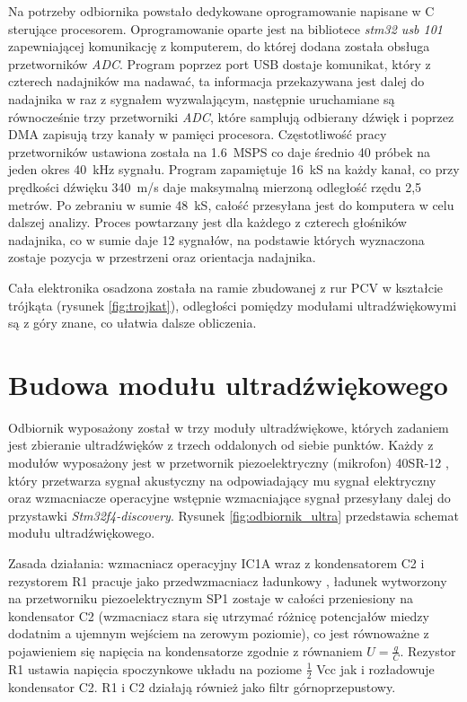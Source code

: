 Na potrzeby odbiornika powstało dedykowane oprogramowanie napisane w C sterujące procesorem.
Oprogramowanie oparte jest na bibliotece \textit{stm32 usb 101} \cite{bib:stm32_usb_101}
zapewniającej komunikację z komputerem, do której dodana została obsługa przetworników \textit{ADC}.
Program poprzez port USB dostaje komunikat, który z czterech nadajników ma nadawać, ta informacja przekazywana jest
dalej do nadajnika w raz z sygnałem wyzwalającym, następnie uruchamiane są równocześnie trzy przetworniki \textit{ADC}, które 
samplują odbierany dźwięk i poprzez DMA zapisują trzy kanały w pamięci procesora.
Częstotliwość pracy przetworników ustawiona została na \SI{1,6}{MSPS} co daje średnio 40 próbek na jeden okres \SI{40}{kHz} sygnału.
Program zapamiętuje \SI{16}{kS} na każdy kanał, co przy prędkości dźwięku \SI{340}{m/s} daje maksymalną mierzoną odległość rzędu 2,5 metrów.
Po zebraniu w sumie \SI{48}{kS}, całość przesyłana jest do komputera w celu dalszej analizy.
Proces powtarzany jest dla każdego z czterech głośników nadajnika, 
co w sumie daje 12 sygnałów, na podstawie których wyznaczona zostaje 
pozycja w przestrzeni oraz orientacja nadajnika.

Cała elektronika osadzona została na ramie zbudowanej z rur PCV w kształcie trójkąta (rysunek \ref{fig:trojkat}), 
odległości pomiędzy modułami ultradźwiękowymi są z góry znane, co ułatwia dalsze obliczenia.




\clearpage
\section{Budowa modułu ultradźwiękowego}

Odbiornik wyposażony został w trzy moduły ultradźwiękowe, których zadaniem jest 
zbieranie ultradźwięków z trzech oddalonych od siebie punktów.
Każdy z modułów wyposażony jest w przetwornik piezoelektryczny (mikrofon) 40SR-12 \cite{bib:40ST12},
który przetwarza sygnał akustyczny na odpowiadający mu sygnał elektryczny oraz wzmacniacze operacyjne 
wstępnie wzmacniające sygnał przesyłany dalej do przystawki \textit{Stm32f4-discovery}.
Rysunek \ref{fig:odbiornik_ultra} przedstawia schemat modułu ultradźwiękowego.


Zasada działania: wzmacniacz operacyjny IC1A wraz z kondensatorem C2 i rezystorem R1 pracuje 
jako przedwzmacniacz ładunkowy \cite{bib:wzm_ladunkowy},
ładunek wytworzony na przetworniku piezoelektrycznym SP1 zostaje w całości przeniesiony na kondensator C2 
(wzmacniacz stara się utrzymać różnicę potencjałów miedzy dodatnim a ujemnym wejściem na zerowym poziomie),
co jest równoważne z pojawieniem się napięcia na kondensatorze zgodnie z równaniem $U=\frac{q}{C}$.
Rezystor R1 ustawia napięcia spoczynkowe układu na poziome $\frac{1}{2}$ Vcc jak i rozładowuje kondensator C2.
R1 i C2 działają również jako filtr górnoprzepustowy.

